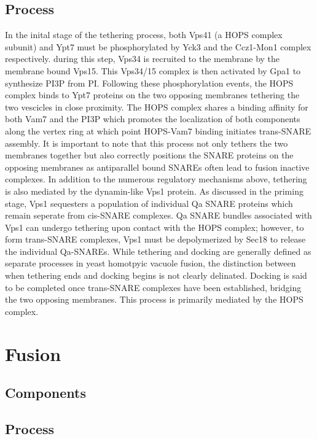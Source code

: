 \documentclass[12pt,twoside]{reedthesis}
\begin{document}
\subsection{Process}\label{process-1}

In the inital stage of the tethering process, both Vps41 (a HOPS complex subunit) and Ypt7 must be phosphorylated by Yck3 and the Ccz1-Mon1 complex respectively. during this step, Vps34 is recruited to the membrane by the membrane bound Vps15. This Vps34/15 complex is then activated by Gpa1 to synthesize PI3P from PI. Following these phosphorylation events, the HOPS complex binds to Ypt7 proteins on the two opposing membranes tethering the two vescicles in close proximity. The HOPS complex shares a binding affinity for both Vam7 and the PI3P which promotes the localization of both components along the vertex ring at which point HOPS-Vam7 binding initiates trans-SNARE assembly. It is important to note that this process not only tethers the two membranes together but also correctly positions the SNARE proteins on the opposing membranes as antiparallel bound SNAREs often lead to fusion inactive complexes. In addition to the numerous regulatory mechanisms above, tethering is also mediated by the dynamin-like Vps1 protein. As discussed in the priming stage, Vps1 sequesters a population of individual Qa SNARE proteins which remain seperate from cis-SNARE complexes. Qa SNARE bundles associated with Vps1 can undergo tethering upon contact with the HOPS complex; however, to form trans-SNARE complexes, Vps1 must be depolymerized by Sec18 to release the individual Qa-SNAREs. While tethering and docking are generally defined as separate processes in yeast homotpyic vacuole fusion, the distinction between when tethering ends and docking begins is not clearly delinated.
Docking is said to be completed once trans-SNARE complexes have been established, bridging the two opposing membranes. This process is primarily mediated by the HOPS complex.

\section{Fusion}\label{fusion}

\subsection{Components}\label{components-2}

\subsection{Process}\label{process-2}
\end{document}
